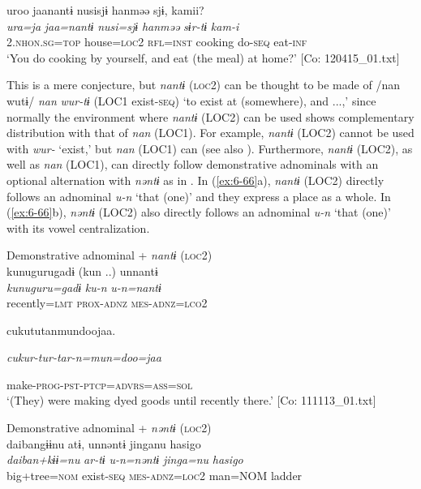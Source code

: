 \begin{table}
\ex {\TM}  uroo  jaanantɨ  nusisjɨ  hanməə  sjɨ,  kamii?\\
\glll \textit{ura=ja}  \textit{jaa=nantɨ}  \textit{nusi=sjɨ}  \textit{hanməə}  \textit{sɨr-tɨ}  \textit{kam-i}\\
2.\textsc{nhon}.\textsc{sg}=\textsc{top}  house=\textsc{loc}2  \textsc{rfl}=\textsc{inst}  cooking  do-\textsc{seq}  eat-\textsc{inf}\\
\glt ‘You do cooking by yourself, and eat (the meal) at home?’ [Co: 120415\_01.txt]
\z

This is a mere conjecture, but \textit{nantɨ} (\textsc{loc}2) can be thought to be made of /nan wutɨ/ \textit{nan} \textit{wur-tɨ} (LOC1 exist-\textsc{seq}) ‘to exist at (somewhere), and ...,’ since normally the environment where \textit{nantɨ} (LOC2) can be used shows complementary distribution with that of \textit{nan} (LOC1). For example, \textit{nantɨ} (LOC2) cannot be used with \textit{wur-} ‘exist,’ but \textit{nan} (LOC1) can (see also ). Furthermore, \textit{nantɨ} (LOC2), as well as \textit{nan} (LOC1), can directly follow demonstrative adnominals with an optional alternation with \textit{nəntɨ} as in . In (\ref{ex:6-66}a), \textit{nantɨ} (LOC2) directly follows an adnominal \textit{u-n} ‘that (one)’ and they express a place as a whole. In (\ref{ex:6-66}b), \textit{nəntɨ} (LOC2) also directly follows an adnominal \textit{u-n} ‘that (one)’ with its vowel centralization.

\ea\label{ex:6-66}
\ea Demonstrative adnominal + \textit{nantɨ} (\textsc{loc}2)\\
{\TM}
\glll  kunugurugadɨ  (kun ..)  unnantɨ\\
\textit{kunuguru=gadɨ}  \textit{ku-n}  \textit{u-n=nantɨ}\\
recently=\textsc{lmt}  \textsc{prox}-\textsc{adnz}  \textsc{mes}-\textsc{adnz}=\textsc{lco}2

      cukututanmundoojaa.

      \textit{cukur-tur-tar-n=mun=doo=jaa}

      make-\textsc{prog}-\textsc{pst}-\textsc{ptcp}=\textsc{advrs}=\textsc{ass}=\textsc{sol}\\
\glt ‘(They) were making dyed goods until recently there.’ [Co: 111113\_01.txt]
\z

\ex Demonstrative adnominal + \textit{nəntɨ} (\textsc{loc}2)\\
{\TM}
\glll  daibangɨɨnu  atɨ,  unnəntɨ  jinganu  {\textbar}hasigo{\textbar}\\
\textit{daiban+kɨɨ=nu}  \textit{ar-tɨ}  \textit{u-n=nəntɨ}  \textit{jinga=nu}  \textit{hasigo}\\
big+tree=\textsc{nom}  exist-\textsc{seq}  \textsc{mes}-\textsc{adnz}=\textsc{loc}2  man=NOM  ladder


\end{table}
